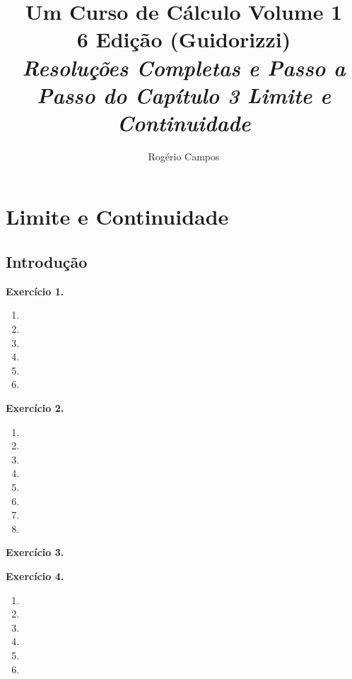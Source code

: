 \documentclass[12pt,a4paper]{article}
\title{
    \Huge \textbf{Um Curso de Cálculo Volume 1} \\
    \vspace{0.3cm}
    \Large 6\textordfeminine{} Edição (Guidorizzi) \\
    \vspace{0.5cm}
    \large \textit{Resoluções Completas e Passo a Passo do Capítulo 3 Limite e Continuidade}
}
\author{Rogério Campos}
\begin{document}
\maketitle
\newpage

\tableofcontents
\newpage

\setcounter{section}{2}
\setcounter{subsection}{1}

\section{Limite e Continuidade}

\subsection{Introdução}

\vspace{0.5cm}
\noindent\textbf{Exercício 1.}
\begin{enumerate}
    \renewcommand{\theenumi}{\alph{enumi}}
    \renewcommand{\labelenumi}{\theenumi)}
    \item 
    \item 
    \item 
    \item 
    \item 
    \item 
\end{enumerate}

\vspace{0.5cm}
\noindent\textbf{Exercício 2.}
\begin{enumerate}
    \renewcommand{\theenumi}{\alph{enumi}}
    \renewcommand{\labelenumi}{\theenumi)}
    \item 
    \item 
    \item 
    \item 
    \item 
    \item 
    \item 
    \item 
\end{enumerate}

\vspace{0.5cm}
\noindent\textbf{Exercício 3.}

\vspace{0.5cm}
\noindent\textbf{Exercício 4.}
\begin{enumerate}
    \renewcommand{\theenumi}{\alph{enumi}}
    \renewcommand{\labelenumi}{\theenumi)}
    \item 
    \item 
    \item 
    \item 
    \item 
    \item 
\end{enumerate}
\end{document}
